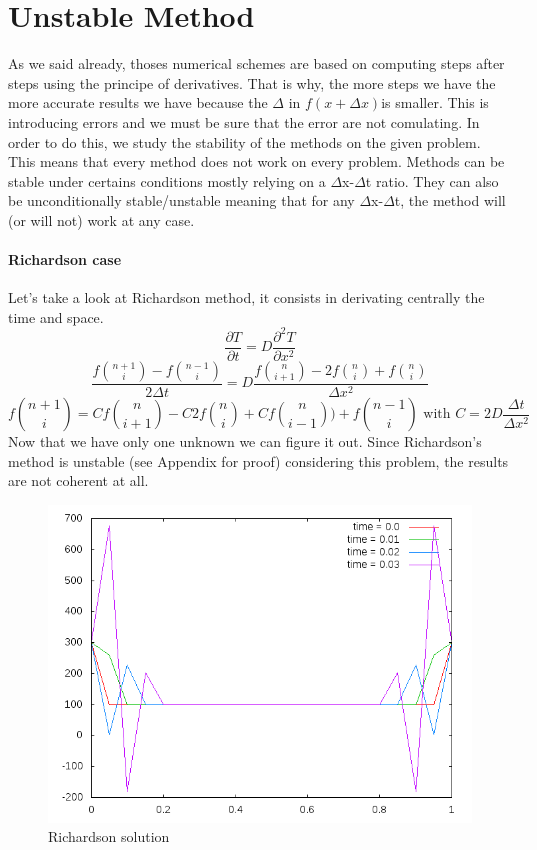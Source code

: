 \documentclass[12pt, a4paper]{report}
\begin{document}
\section{Unstable Method}
As we said already, thoses numerical schemes are based on computing steps after steps using the principe of derivatives. That is why, the more steps we have the more accurate results we have because the $\Delta$ in $f(x+\Delta x)$is smaller. This is introducing errors and we must be sure that the error are not comulating. In order to do this, we study the stability of the methods on the given problem. This means that every method does not work on every problem. Methods can be stable under certains conditions mostly relying on a $\Delta$x-$\Delta$t ratio. They can also be unconditionally stable/unstable meaning that for any $\Delta$x-$\Delta$t, the method will (or will not) work at any case.
\paragraph{Richardson case}
Let's take a look at Richardson method, it consists in derivating centrally the time and space.
\begin{equation}\frac{\partial T}{\partial t} = D\frac{\partial^2T }{\partial x^2}
\end{equation} 
\begin{equation}\frac{f\binom{n+1}{i} - f\binom{n-1}{i}}{2\Delta t} = D\frac{f\binom{n}{i+1} - 2f\binom{n}{i}+ f\binom{n}{i}}{\Delta x^{2}}
\end{equation} 
\begin{equation}f\binom{n+1}{i} = Cf\binom{n}{i+1} - C2f\binom{n}{i}+ Cf\binom{n}{i-1})+f\binom{n-1}{i} \text{ with }
C = 2D\frac{\Delta t}{\Delta x^{2}}
\end{equation} 
Now that we have only one unknown we can figure it out. Since Richardson's method is unstable (see Appendix for proof) considering this problem, the results are not coherent at all.\\
\begin{figure}[h]
\centering
\includegraphics[scale=0.6]{Richardson.png}
\caption{Richardson solution}
\end{figure}
\end{document}
